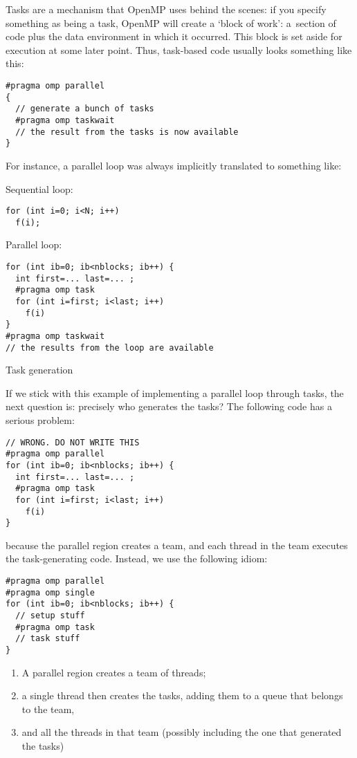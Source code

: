 
\label{sec:omp:task}

Tasks are a mechanism that OpenMP uses behind the scenes:
if you specify something as being a task, OpenMP will create
a `block of work': a~section of code plus the data environment
in which it occurred. This block is set aside for execution at some later point.
Thus, task-based code usually looks something like this:
\begin{lstlisting}
#pragma omp parallel
{
  // generate a bunch of tasks
  #pragma omp taskwait
  // the result from the tasks is now available  
}
\end{lstlisting}
For instance, a parallel loop was always implicitly translated to something like:
\begin{multicols}{2}
Sequential loop:
\begin{lstlisting}
for (int i=0; i<N; i++)
  f(i);
\end{lstlisting}
\columnbreak
Parallel loop:
\begin{lstlisting}
for (int ib=0; ib<nblocks; ib++) {
  int first=... last=... ;
  #pragma omp task
  for (int i=first; i<last; i++)
    f(i)
}
#pragma omp taskwait
// the results from the loop are available
\end{lstlisting}
\end{multicols}

 {Task generation}

If we stick with this example of implementing a parallel loop
through tasks, the next question is: precisely who generates the tasks?
The following code has a serious problem:
\begin{lstlisting}
// WRONG. DO NOT WRITE THIS
#pragma omp parallel
for (int ib=0; ib<nblocks; ib++) {
  int first=... last=... ;
  #pragma omp task
  for (int i=first; i<last; i++)
    f(i)
}
\end{lstlisting}
because the parallel region creates a team, and each thread in the team
executes the task-generating code.
Instead, we use the following idiom:
\begin{lstlisting}
#pragma omp parallel
#pragma omp single
for (int ib=0; ib<nblocks; ib++) {
  // setup stuff
  #pragma omp task
  // task stuff
}
\end{lstlisting}
\begin{enumerate}
\item A parallel region creates a team of threads;
\item a single thread then creates the tasks, adding them to a queue
  that belongs to the team,
\item and all the threads in that team (possibly including the one
  that generated the tasks) 
\end{enumerate}

